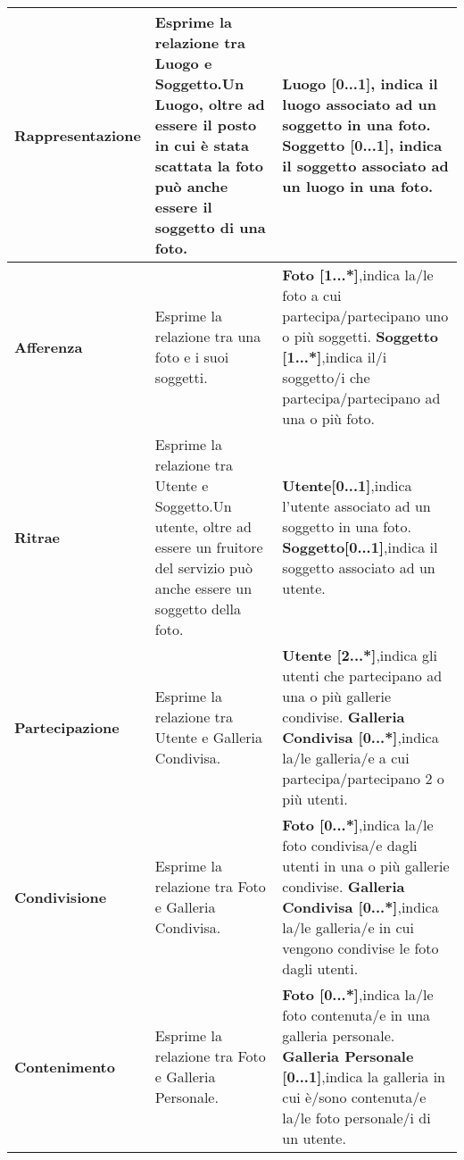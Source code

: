 \begin{xltabular}{\textwidth}{l X X}
        \textbf{Rappresentazione} & Esprime la relazione tra Luogo e Soggetto.Un Luogo, oltre ad essere il posto in cui è stata scattata la foto può anche essere il soggetto di una foto. & \textbf{Luogo [0...1]}, indica il luogo associato ad un soggetto in una foto. 
        \newline\textbf{Soggetto [0...1]}, indica il soggetto associato ad un luogo in una foto. \\
        \hline
        \textbf{Afferenza} & Esprime la relazione tra una foto e i suoi soggetti. & \textbf{Foto [1...*]},indica la/le foto a cui partecipa/partecipano uno o più soggetti. 
        \newline\textbf{Soggetto [1...*]},indica il/i soggetto/i che partecipa/partecipano ad una o più foto. \\
        \hline
        \textbf{Ritrae} & Esprime la relazione tra Utente e Soggetto.Un utente, oltre ad essere un fruitore del servizio può anche essere un soggetto della foto. & \textbf{Utente[0...1]},indica l'utente associato ad un soggetto in una foto. 
        \newline\textbf{Soggetto[0...1]},indica il soggetto associato ad un utente. \\
        \hline
        \textbf{Partecipazione} & Esprime la relazione tra Utente e Galleria Condivisa. & \textbf{Utente [2...*]},indica gli utenti che partecipano ad una o più gallerie condivise. 
        \newline\textbf{Galleria Condivisa [0...*]},indica la/le galleria/e a cui partecipa/partecipano 2 o più utenti.\\
        \hline
        \textbf{Condivisione} & Esprime la relazione tra Foto e Galleria Condivisa. & \textbf{Foto [0...*]},indica la/le foto condivisa/e dagli utenti in una o più gallerie condivise. 
        \newline\textbf{Galleria Condivisa [0...*]},indica la/le galleria/e in cui vengono condivise le foto dagli utenti. \\
        \hline
        \textbf{Contenimento} & Esprime la relazione tra Foto e Galleria Personale. & \textbf{Foto [0...*]},indica la/le foto contenuta/e in una galleria personale. 
        \newline\textbf{Galleria Personale [0...1]},indica la galleria in cui è/sono contenuta/e la/le foto personale/i di un utente.\\
        
 \end{xltabular}
\endgroup

